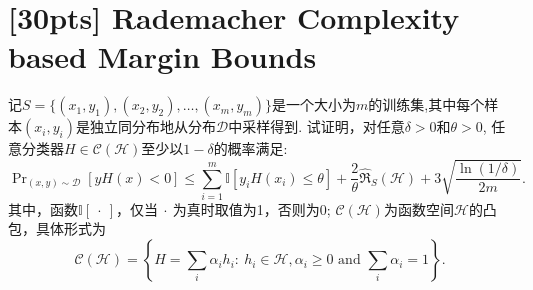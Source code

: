 \documentclass[a4paper,UTF8]{article}
\numberwithin{equation}{section}
\begin{document}
\newpage
\section{[30pts] Rademacher Complexity based Margin Bounds}

\noindent 记$S=\{(x_1,y_1),(x_2,y_2),\ldots,(x_m,y_m)\}$是一个大小为$m$的训练集,其中每个样本$(x_i,y_i)$是独立同分布地从分布$\mathcal{D}$中采样得到. 试证明，对任意$\delta > 0$和$\theta > 0$, 任意分类器$H \in \mathcal{C}(\mathcal{H})$至少以$1-\delta$的概率满足:
\begin{equation}
	\label{eq:margin-bound}
	\Pr\nolimits_{(x,y)\sim \mathcal{D}}[yH(x)<0]\leq \sum_{i=1}^{m}\mathbb{I}[y_i H(x_i)\leq\theta]+\frac{2}{\theta}\hat{\mathfrak{R}}_S(\mathcal{H})+3\sqrt{\frac{\ln(1/\delta)}{2m}}.
\end{equation}
其中，函数$\mathbb{I}[\ \cdot \ ]$，仅当$\ \cdot \ $为真时取值为1，否则为0; $\mathcal{C}(\mathcal{H})$为函数空间$\mathcal{H}$的凸包，具体形式为
\[
	\mathcal{C}(\mathcal{H}) = \left\{ H = \sum_{i} \alpha_i h_i: \ h_i \in \mathcal{H}, \alpha_i \geq 0 \mbox{ and } \sum_{i}\alpha_i = 1\right\}.
\]
	
\end{document}
